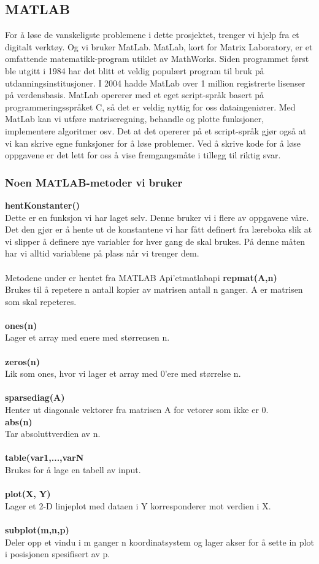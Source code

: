 \subsection{MATLAB}
For å løse de vanskeligste problemene i dette prosjektet, trenger vi hjelp fra et digitalt verktøy. Og vi bruker MatLab. MatLab, kort for Matrix Laboratory, er et omfattende matematikk-program utiklet av MathWorks. Siden programmet først ble utgitt i 1984 har det blitt et veldig populært program til bruk på utdanningsinstitusjoner. I 2004 hadde MatLab over 1 million registrerte lisenser på verdensbasis.
MatLab opererer med et eget script-språk basert på programmeringsspråket C, så det er veldig nyttig for oss dataingeniører. Med MatLab kan vi utføre matriseregning, behandle og plotte funksjoner, implementere algoritmer osv. Det at det opererer på et script-språk gjør også at vi kan skrive egne funksjoner for å løse problemer. Ved å skrive kode for å løse oppgavene er det lett for oss å vise fremgangsmåte i tillegg til riktig svar.
\subsubsection{Noen MATLAB-metoder vi bruker}
\textbf{hentKonstanter()}\\
Dette er en funksjon vi har laget selv. Denne bruker vi i flere av oppgavene våre. Det den gjør er å hente ut de konstantene vi har fått definert fra læreboka slik at vi slipper å definere nye variabler for hver gang de skal brukes. På denne måten har vi alltid variablene på plass når vi trenger dem.\\
\\
Metodene under er hentet fra MATLAB Api'et{matlabapi}
\textbf{repmat(A,n)}\\
Brukes til å repetere n antall kopier av matrisen antall n ganger. A er matrisen som skal repeteres.\\
\\
\textbf{ones(n)}\\
Lager et array med enere med størrensen n.\\
\\
\textbf{zeros(n)}\\
Lik som ones, hvor vi lager et array med 0'ere med størrelse n.\\
\\
\textbf{sparsediag(A)}\\
Henter ut diagonale vektorer fra matrisen A for vetorer som ikke er 0.
\\
\textbf{abs(n)}\\
Tar absoluttverdien av n.\\
\\
\textbf{table(var1,...,varN}\\
Brukes for å lage en tabell av input.\\
\\
\textbf{plot(X, Y)}\\
Lager et 2-D linjeplot med  dataen i Y korresponderer mot verdien i X.\\
\\
\textbf{subplot(m,n,p)}\\
Deler opp et vindu i m ganger n koordinatsystem og lager akser for å sette in plot i posisjonen spesifisert av p.
